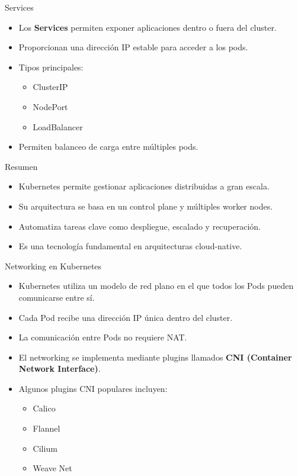 \documentclass{beamer}
\begin{document}
\begin{frame}{Services}
\begin{itemize}
\item Los \textbf{Services} permiten exponer aplicaciones dentro o fuera del cluster.
\item Proporcionan una dirección IP estable para acceder a los pods.
\item Tipos principales:
\begin{itemize}
\item ClusterIP
\item NodePort
\item LoadBalancer
\end{itemize}
\item Permiten balanceo de carga entre múltiples pods.
\end{itemize}
\end{frame}

\begin{frame}{Resumen}
\begin{itemize}
\item Kubernetes permite gestionar aplicaciones distribuidas a gran escala.
\item Su arquitectura se basa en un control plane y múltiples worker nodes.
\item Automatiza tareas clave como despliegue, escalado y recuperación.
\item Es una tecnología fundamental en arquitecturas cloud-native.
\end{itemize}
\end{frame}

\begin{frame}{Networking en Kubernetes}
\begin{itemize}
\item Kubernetes utiliza un modelo de red plano en el que todos los Pods pueden comunicarse entre sí.
\item Cada Pod recibe una dirección IP única dentro del cluster.
\item La comunicación entre Pods no requiere NAT.
\item El networking se implementa mediante plugins llamados \textbf{CNI (Container Network Interface)}.
\item Algunos plugins CNI populares incluyen:
\begin{itemize}
\item Calico
\item Flannel
\item Cilium
\item Weave Net
\end{itemize}
\end{itemize}
\end{frame}
\end{document}
